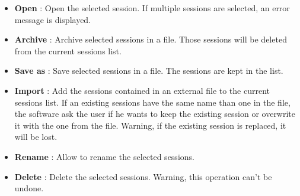 \begin{itemize}

\item \textbf{Open} : Open the selected session. If multiple sessions are selected, an error message is displayed.\\
\item \textbf{Archive} : Archive selected sessions in a file. Those sessions will be deleted from the current sessions list.\\
\item \textbf{Save as} : Save selected sessions in a file. The sessions are kept in the list.\\
\item \textbf{Import} : Add the sessions contained in an external file to the current sessions list. If an existing sessions have the same name than one in the file, the software ask the user if he wants to keep the existing session or overwrite it with the one from the file. Warning, if the existing session is replaced, it will be lost.\\
\item \textbf{Rename} : Allow to rename the selected sessions.\\
\item \textbf{Delete} : Delete the selected sessions. Warning, this operation can't be undone.\\
\end{itemize}

